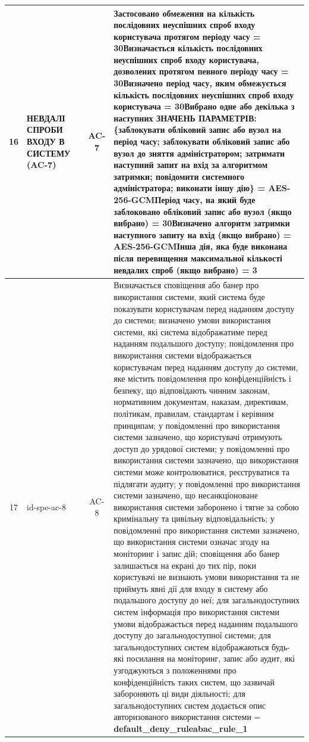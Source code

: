 \documentclass[10pt]{article}
\begin{document}
\begin{longtable}{|c|>{\raggedright\arraybackslash}p{2.5cm}|>{\raggedright\arraybackslash}p{4.5cm}|c|>{\raggedright\arraybackslash}p{4.5cm}|}
16 & НЕВДАЛІ СПРОБИ ВХОДУ В СИСТЕМУ (AC-7) &  & AC-7 & Застосовано обмеження на кількість послідовних неуспішних спроб входу користувача протягом періоду часу = \textbf{30}\newline Визначається кількість послідовних неуспішних спроб входу користувача, дозволених протягом певного періоду часу = \textbf{30}\newline Визначено період часу, яким обмежується кількість послідовних неуспішних спроб входу користувача = \textbf{30}\newline Вибрано одне або декілька з наступних ЗНАЧЕНЬ ПАРАМЕТРІВ: \{заблокувати обліковий запис або вузол на період часу; заблокувати обліковий запис або вузол до зняття адміністратором; затримати наступний запит на вхід за алгоритмом затримки; повідомити системного адміністратора; виконати іншу дію\} = \textbf{AES-256-GCM}\newline Період часу, на який буде заблоковано обліковий запис або вузол (якщо вибрано) = \textbf{30}\newline Визначено алгоритм затримки наступного запиту на вхід (якщо вибрано) = \textbf{AES-256-GCM}\newline Інша дія, яка буде виконана після перевищення максимальної кількості невдалих спроб (якщо вибрано) = \textbf{3} \\ \hline
17 & id-spe-ac-8 &  & AC-8 & Визначається сповіщення або банер про використання системи, який система буде показувати користувачам перед наданням доступу до системи; визначено умови використання системи, які система відображатиме перед наданням подальшого доступу; повідомлення про використання системи відображається користувачам перед наданням доступу до системи, яке містить повідомлення про конфіденційність і безпеку, що відповідають чинним законам, нормативним документам, наказам, директивам, політикам, правилам, стандартам і керівним принципам; у повідомленні про використання системи зазначено, що користувачі отримують доступ до урядової системи; у повідомленні про використання системи зазначено, що використання системи може контролюватися, реєструватися та підлягати аудиту; у повідомленні про використання системи зазначено, що несанкціоноване використання системи заборонено і тягне за собою кримінальну та цивільну відповідальність; у повідомленні про використання системи зазначено, що використання системи означає згоду на моніторинг і запис дій; сповіщення або банер залишається на екрані до тих пір, поки користувачі не визнають умови використання та не приймуть явні дії для входу в систему або подальшого доступу до неї; для загальнодоступних систем інформація про використання системи умови відображається перед наданням подальшого доступу до загальнодоступної системи; для загальнодоступних систем відображаються будь-які посилання на моніторинг, запис або аудит, які узгоджуються з положеннями про конфіденційність таких систем, що зазвичай забороняють ці види діяльності; для загальнодоступних систем додається опис авторизованого використання системи = \textbf{default\_\allowbreak{}deny\_\allowbreak{}ruleabac\_\allowbreak{}rule\_\allowbreak{}1} \\ \hline

\end{longtable}
\end{document}

